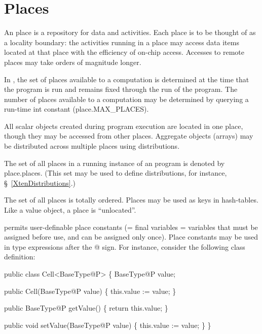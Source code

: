 \chapter{Places}
\label{XtenPlaces}

An \Xten{} place is a repository for data and activities. Each place is to
be thought of as a locality boundary: the activities running in a
place may access data items located at that place with the efficiency
of on-chip access. Accesses to remote places may take orders of
magnitude longer.

In \XtenCurrVer{}, the set of places available to a computation is
determined at the time that the program is run and remains fixed
through the run of the program. The number of places available to a
computation may be determined by querying a run-time int constant
({\cf place.MAX\_PLACES}).

All scalar objects created during program execution are located in one
place, though they may be accessed from other places. Aggregate
objects (arrays) may be distributed across multiple places using
distributions.

The set of all places in a running instance of an \Xten{} program is
denoted by {\cf place.places}. (This set may be used to define
distributions, for instance, \S~\ref{XtenDistributions}.)



The set of all places is totally ordered. Places may be used as keys
in hash-tables. Like a value object, a place is ``unlocated''.

\Xten{} permits user-definable place constants (= final variables =
variables that must be assigned before use, and can be assigned only
once). Place constants may be used in type expressions after the {\cf @}
sign. For instance, consider the following class definition:

\begin{x10}
 public class Cell<BaseType@P> \{
  BaseType@P value;

  public Cell(BaseType@P value) \{  
     this.value := value;
  \}

  public BaseType@P getValue() \{
     return this.value;
  \}

  public void setValue(BaseType@P value) \{
     this.value := value;
  \}
 \}
\end{x10}


